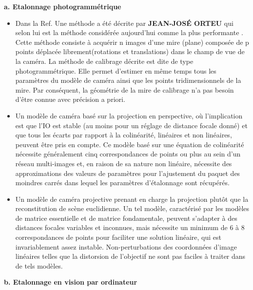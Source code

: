 \documentclass[12pt,a4paper]{report}
\begin{document}
\begin{center}
	\textbf{ a. Etalonnage photogrammétrique}
\end{center}

\begin{itemize}
	\item Dans la Ref.\cite{orteu_calibrage_nodate} Une méthode a été décrite par \textbf{JEAN-JOSÉ ORTEU} qui selon lui est la méthode considérée aujourd'hui comme la plus performante . Cette méthode consiste à acquérir n images d'une mire (plane) composée de p points déplacée librement(rotations et translations) dans le champ de vue de la caméra. La méthode de calibrage décrite est dite de type photogrammétrique. Elle permet d'estimer en même temps tous les paramètres du modèle de caméra ainsi que les points tridimensionnels de la mire. Par conséquent, la géométrie de la mire de calibrage n'a pas besoin d'être connue avec précision a priori.\\
	
	\item Un modèle de caméra \cite{remondino_digital_2006}basé sur la projection en perspective, où l'implication est que
	l'IO est stable (au moins pour un réglage de distance focale donné) et que tous les écarts par rapport à la colinéarité, linéaires et non linéaires, peuvent être pris
	en compte. Ce modèle basé sur une équation de colinéarité nécessite
	généralement cinq correspondances de points ou plus au sein d'un réseau multi-images et, en raison de sa nature non linéaire, nécessite des approximations des valeurs de paramètres pour l'ajustement du paquet des moindres carrés dans lequel les paramètres d'étalonnage sont récupérés.\\
	
	\item Un modèle de caméra projective prenant en charge la projection plutôt que la reconstitution de scène euclidienne. Un tel modèle, caractérisé
	par les modèles de matrice essentielle et de matrice fondamentale, peuvent s'adapter à des distances focales variables et inconnues, mais nécessite un minimum de 6 à 8 correspondances de points pour faciliter une
	solution linéaire, qui est invariablement assez instable. Non-perturbations des coordonnées d'image linéaires telles que la distorsion de l'objectif ne sont pas faciles à traiter dans de tels modèles.\\
\end{itemize}

\begin{center}
	\textbf{b. Etalonnage en vision par ordinateur}
\end{center}
\end{document}
